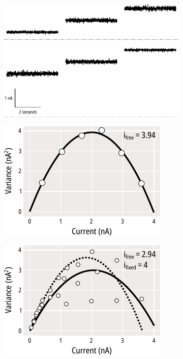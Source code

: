 \begin{figure}[hbtp]
	\centering
	\begin{subfigure}[t]{0.3\textwidth}
		\caption{}\label{ch4fig:simulated_noise_1}
		\centering
		\includegraphics[width=\textwidth]{simulated_noise_1.pdf}
	\end{subfigure}
	\hfill
	\begin{subfigure}[t]{0.3\textwidth}
		\caption{}\label{ch4fig:simulated_noise_2}
		\centering
		\includegraphics[width=\textwidth]{simulated_noise_2.pdf}
	\end{subfigure}
	\hfill
	\begin{subfigure}[t]{0.3\textwidth}
		\caption{}\label{ch4fig:simulated_noise_3}
		\centering
		\includegraphics[width=\textwidth]{simulated_noise_3.pdf}

\end{subfigure}
\end{figure}
